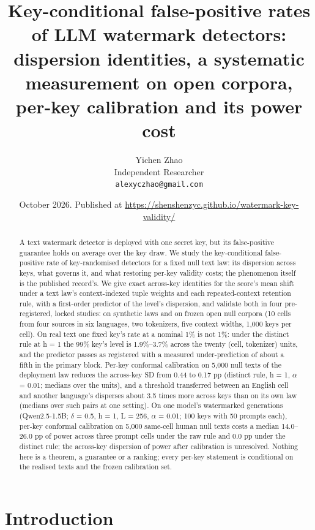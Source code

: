 \documentclass[11pt,letterpaper]{article}
\title{Key-conditional false-positive rates of LLM watermark detectors: dispersion identities, a systematic measurement on open corpora, per-key calibration and its power cost}
\author{Yichen Zhao\\ Independent Researcher\\ \texttt{alexyczhao@gmail.com}}
\date{October 2026. Published at \url{https://shenshenzyc.github.io/watermark-key-validity/}}
\begin{document}
\maketitle

\begin{abstract}
A text watermark detector is deployed with one secret key, but its false-positive guarantee holds on average over the key draw. We study the key-conditional false-positive rate of key-randomised detectors for a fixed null text law: its dispersion across keys, what governs it, and what restoring per-key validity costs; the phenomenon itself is the published record's. We give exact across-key identities for the score's mean shift under a text law's context-indexed tuple weights and each repeated-context retention rule, with a first-order predictor of the level's dispersion, and validate both in four pre-registered, locked studies: on synthetic laws and on frozen open null corpora (10 cells from four sources in six languages, two tokenizers, five context widths, 1,000 keys per cell). On real text one fixed key's rate at a nominal 1\% is not 1\%: under the distinct rule at h = 1 the 99\% key's level is 1.9\%--3.7\% across the twenty (cell, tokenizer) units, and the predictor passes as registered with a measured under-prediction of about a fifth in the primary block. Per-key conformal calibration on 5,000 null texts of the deployment law reduces the across-key SD from 0.44 to 0.17 pp (distinct rule, h = 1, \ensuremath{\alpha} = 0.01; medians over the units), and a threshold transferred between an English cell and another language's disperses about 3.5 times more across keys than on its own law (medians over such pairs at one setting). On one model's watermarked generations (Qwen2.5-1.5B; \ensuremath{\delta} = 0.5, h = 1, L = 256, \ensuremath{\alpha} = 0.01; 100 keys with 50 prompts each), per-key conformal calibration on 5,000 same-cell human null texts costs a median 14.0--26.0 pp of power across three prompt cells under the raw rule and 0.0 pp under the distinct rule; the across-key dispersion of power after calibration is unresolved. Nothing here is a theorem, a guarantee or a ranking; every per-key statement is conditional on the realised texts and the frozen calibration set.
\end{abstract}

\hypertarget{introduction}{%
\section{Introduction}\label{introduction}}
\end{document}
